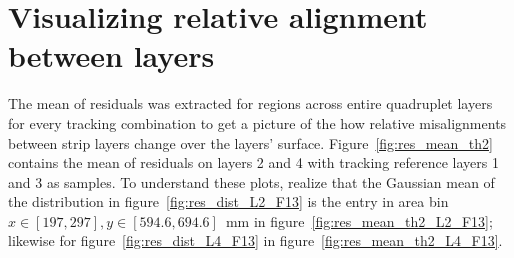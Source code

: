 \section{Visualizing relative alignment between layers}

The mean of residuals was extracted for regions across entire quadruplet layers for every tracking combination to get a picture of the how relative misalignments between strip layers change over the layers' surface. Figure~\ref{fig:res_mean_th2} contains the mean of residuals on layers 2 and 4 with tracking reference layers 1 and 3 as samples. To understand these plots, realize that the Gaussian mean of the distribution in figure~\ref{fig:res_dist_L2_F13} is the entry in area bin $x\in\left[197, 297\right],  y\in\left[594.6, 694.6\right]$~mm in figure~\ref{fig:res_mean_th2_L2_F13}; likewise for figure~\ref{fig:res_dist_L4_F13} in figure~\ref{fig:res_mean_th2_L4_F13}.

